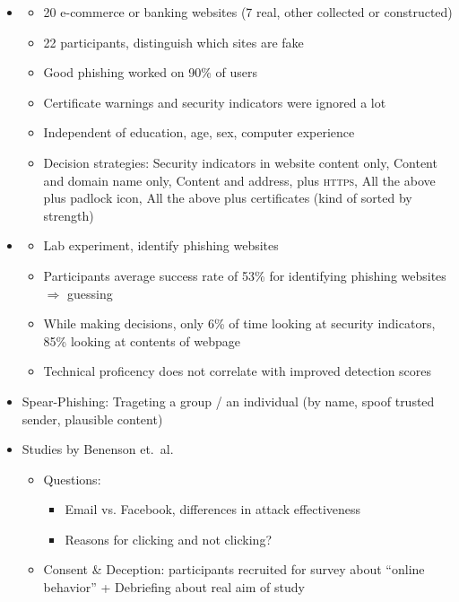 \documentclass[a4paper,12pt]{scrartcl}
\begin{document}
\begin{itemize}
\begin{itemize}
		\end{itemize}
	\item
		\begin{itemize}
			\item
				20 e-commerce or banking websites (7 real, other collected or constructed)
			\item
				22 participants, distinguish which sites are fake
			\item
				Good phishing worked on 90\% of users
			\item
				Certificate warnings and security indicators were ignored a lot
			\item
				Independent of education, age, sex, computer experience
			\item
				Decision strategies: Security indicators in website content only, Content and domain name only, Content and address, plus \textsc{https}, All the above plus padlock icon, All the above plus certificates (kind of sorted by strength)
		\end{itemize}
	\item
		\begin{itemize}
			\item
				Lab experiment, identify phishing websites
			\item
				Participants average success rate of 53\% for identifying phishing websites $\Rightarrow$ guessing
			\item
				While making decisions, only 6\% of time looking at security indicators, 85\% looking at contents of webpage
			\item
				Technical proficency does not correlate with improved detection scores
		\end{itemize}
	\item
		Spear-Phishing: Trageting a group / an individual (by name, spoof trusted sender, plausible content)
	\item
		Studies by Benenson et.\ al.
		\begin{itemize}
			\item
				Questions:
				\begin{itemize}
					\item
						Email vs. Facebook, differences in attack effectiveness
					\item
						Reasons for clicking and not clicking?
				\end{itemize}
			\item
				Consent \& Deception: participants recruited for survey about \enquote{online behavior} + Debriefing about real aim of study

\end{itemize}
\end{itemize}
\end{document}
